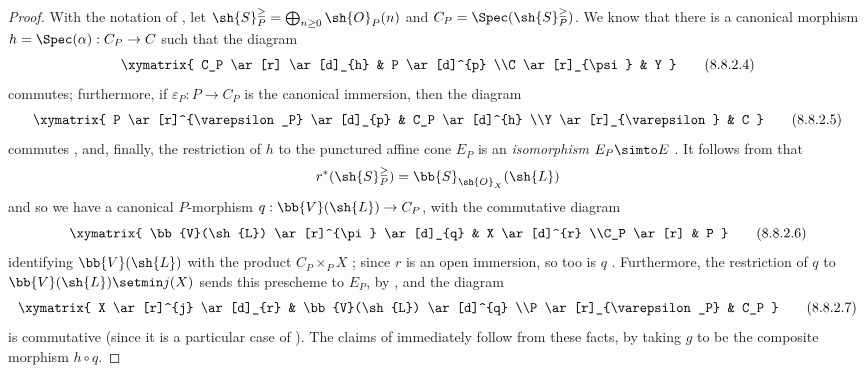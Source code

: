 \begin{proof}
With the notation of , let $\sh{S}_P^\geq = \bigoplus_{n\geq0}\sh{O}_P(n)$ and $C_P=\Spec(\sh{S}_P^\geq)$.
We know  that there is a canonical morphism $h=\Spec(\alpha):C_P\to C$ such that the diagram
\[
\label{II.8.8.2.4}
  \xymatrix{
    C_P
      \ar[r]
      \ar[d]_{h}
  & P
      \ar[d]^{p}
  \\C
      \ar[r]_{\psi}
  & Y
  }
\tag{8.8.2.4}
\]
commutes; furthermore, if $\varepsilon_P:P\to C_P$ is the canonical immersion, then the diagram
\[
\label{II.8.8.2.5}
  \xymatrix{
    P
      \ar[r]^{\varepsilon_P}
      \ar[d]_{p}
  & C_P
      \ar[d]^{h}
  \\Y
      \ar[r]_{\varepsilon}
  & C
  }
\tag{8.8.2.5}
\]
commutes , and, finally, the restriction of $h$ to the punctured affine cone $E_P$ is an \emph{isomorphism} $E_P\simto E$ .
It follows from  that
\[
  r^*(\sh{S}_P^\geq)=\bb{S}_{\sh{O}_X}(\sh{L})
\]
and so we have a canonical $P$-morphism $q:\bb{V}(\sh{L})\to C_P$, with the commutative diagram
\[
\label{II.8.8.2.6}
  \xymatrix{
    \bb{V}(\sh{L})
      \ar[r]^{\pi}
      \ar[d]_{q}
  & X
      \ar[d]^{r}
  \\C_P
      \ar[r]
  & P
  }
\tag{8.8.2.6}
\]
identifying $\bb{V}(\sh{L})$ with the product $C_P\times_P X$ ;
since $r$ is an open immersion, so too is $q$ .
Furthermore, the restriction of $q$ to $\bb{V}(\sh{L})\setmin j(X)$ sends this prescheme to $E_P$, by , and the diagram
\[
\label{II.8.8.2.7}
  \xymatrix{
    X
      \ar[r]^{j}
      \ar[d]_{r}
  & \bb{V}(\sh{L})
      \ar[d]^{q}
  \\P
      \ar[r]_{\varepsilon_P}
  & C_P
  }
\tag{8.8.2.7}
\]
is commutative (since it is a particular case of ).
The claims of  immediately follow from these facts, by taking $g$ to be the composite morphism $h\circ q$.
\end{proof}

